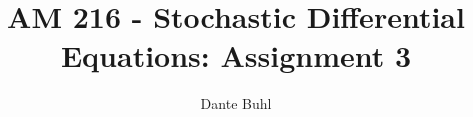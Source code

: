 \documentclass{article}
\begin{document}
\title{AM 216 - Stochastic Differential Equations: Assignment 3}
\author{Dante Buhl}


\newcommand{\wrms}{w_{\text{rms}}}
\newcommand{\bs}[1]{\boldsymbol{#1}}
\newcommand{\tb}[1]{\textbf{#1}}
\newcommand{\bmp}[1]{\begin{minipage}{#1\textwidth}}
\newcommand{\emp}{\end{minipage}}
\newcommand{\R}{\mathbb{R}}
\newcommand{\C}{\mathbb{C}}
\newcommand{\N}{\mathcal{N}}
\newcommand{\Var}{\text{Var}}
\newcommand{\Cov}{\text{Cov}}
\newcommand{\Bino}{\text{Bino}}
\newcommand{\Norm}{\mathcal{N}}
\newcommand{\erf}{\text{erf}}
\newcommand{\m}{\bs{\mu}_*}
\newcommand{\s}{\bs{\Sigma}_*}
\newcommand{\dt}{\Delta t}
\newcommand{\dx}{\Delta x}
\newcommand{\tr}[1]{\text{Tr}(#1)}
\newcommand{\Tr}[1]{\text{Tr}(#1)}
\newcommand{\Div}{\nabla \cdot}
\renewcommand{\div}{\nabla \cdot}
\newcommand{\Curl}{\nabla \times}
\newcommand{\Grad}{\nabla}
\newcommand{\grad}{\nabla}
\newcommand{\grads}{\nabla_s}
\newcommand{\gradf}{\nabla_f}
\newcommand{\xs}{x_s}
\newcommand{\x}{\bs{x}}
\newcommand{\xf}{x_f}
\newcommand{\ts}{t_s}
\newcommand{\tf}{t_f}
\newcommand{\pt}{\partial t}
\newcommand{\pz}{\partial z}
\newcommand{\uvec}{\bs{u}}
\newcommand{\bvec}{\bs{B}}
\newcommand{\nvec}{\hat{\bs{n}}}
\newcommand{\tu}{\tilde{\uvec}}
\newcommand{\B}{\bs{B}}
\newcommand{\A}{\bs{A}}
\newcommand{\jvec}{\bs{j}}
\newcommand{\F}{\bs{F}}
\newcommand{\T}{\tilde{T}}
\newcommand{\ez}{\bs{e}_z}
\newcommand{\ex}{\bs{e}_x}
\newcommand{\ey}{\bs{e}_y}
\newcommand{\eo}{\bs{e}_{\bs{\Omega}}}
\newcommand{\ppt}[1]{\frac{\partial #1}{\partial t}}
\newcommand{\pp}[2]{\frac{\partial #1}{\partial #2}}
\newcommand{\pptwo}[2]{\frac{\partial^2 #1}{\partial #2^2}}
\newcommand{\ddtwo}[2]{\frac{d^2 #1}{d #2^2}}
\newcommand{\DDt}[1]{\frac{D #1}{D t}}
\newcommand{\ppts}[1]{\frac{\partial #1}{\partial t_s}}
\newcommand{\pptf}[1]{\frac{\partial #1}{\partial t_f}}
\newcommand{\ppz}[1]{\frac{\partial #1}{\partial z}}
\newcommand{\ddz}[1]{\frac{d #1}{d z}}
\newcommand{\ppzetas}[1]{\frac{\partial^2 #1}{\partial \zeta^2}}
\newcommand{\ppzs}[1]{\frac{\partial #1}{\partial z_s}}
\newcommand{\ppzf}[1]{\frac{\partial #1}{\partial z_f}}
\newcommand{\ppx}[1]{\frac{\partial #1}{\partial x}}
\newcommand{\ddx}[1]{\frac{d #1}{d x}}
\newcommand{\ppxi}[1]{\frac{\partial #1}{\partial x_i}}
\newcommand{\ppxj}[1]{\frac{\partial #1}{\partial x_j}}
\newcommand{\ppy}[1]{\frac{\partial #1}{\partial y}}
\newcommand{\ppzeta}[1]{\frac{\partial #1}{\partial \zeta}}
\renewcommand{\k}{\bs{k}}
\newcommand{\real}[1]{\text{Re}\left[#1\right]}
\end{document}
